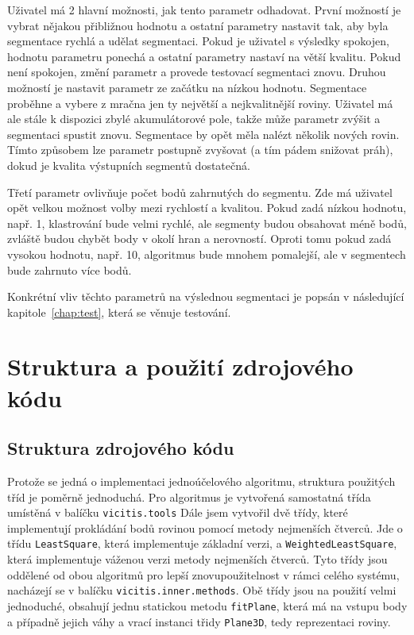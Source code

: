 \documentclass[11pt,twoside,a4paper]{book}
\begin{document}
Uživatel má 2 hlavní možnosti, jak tento parametr odhadovat. První možností je vybrat nějakou přibližnou hodnotu a ostatní parametry nastavit tak, aby byla segmentace rychlá a udělat  segmentaci. Pokud je uživatel s výsledky spokojen, hodnotu parametru ponechá a ostatní parametry nastaví na větší kvalitu. Pokud není spokojen, změní parametr a provede testovací segmentaci znovu. Druhou možností je nastavit parametr ze začátku na nízkou hodnotu. Segmentace proběhne a vybere z mračna jen ty největší a nejkvalitnější roviny. Uživatel má ale stále k dispozici zbylé akumulátorové pole, takže může parametr zvýšit a segmentaci spustit znovu. Segmentace by opět měla nalézt několik nových rovin. Tímto způsobem lze parametr postupně zvyšovat (a tím pádem snižovat práh), dokud je kvalita výstupních segmentů dostatečná.

Třetí parametr ovlivňuje počet bodů zahrnutých do segmentu. Zde má uživatel opět velkou možnost volby mezi rychlostí a kvalitou. Pokud zadá nízkou hodnotu, např. 1, klastrování bude velmi rychlé, ale segmenty budou obsahovat méně bodů, zvláště budou chybět body v okolí hran a nerovností. Oproti tomu pokud zadá vysokou hodnotu, např. 10, algoritmus bude mnohem pomalejší, ale v segmentech bude zahrnuto více bodů.

Konkrétní vliv těchto parametrů na výslednou segmentaci je popsán v následující kapitole~\ref{chap:test}, která se věnuje testování.

\section{Struktura a použití zdrojového kódu}


\subsection{Struktura zdrojového kódu}

Protože se jedná o implementaci jednoúčelového algoritmu, struktura použitých tříd je poměrně jednoduchá. Pro  algoritmus je vytvořená samostatná třída umístěná v balíčku \verb|vicitis.tools| Dále jsem vytvořil dvě třídy, které implementují prokládání bodů rovinou pomocí metody nejmenších čtverců. Jde o třídu \verb|LeastSquare|, která implementuje základní verzi, a \verb|WeightedLeastSquare|, která implementuje váženou verzi metody nejmenších čtverců. Tyto třídy jsou oddělené od obou algoritmů pro lepší znovupoužitelnost v rámci celého systému, nacházejí se v balíčku \verb|vicitis.inner.methods|. Obě třídy jsou na použití velmi jednoduché, obsahují jednu statickou metodu \verb|fitPlane|, která má na vstupu body a případně jejich váhy a vrací instanci třidy \verb|Plane3D|, tedy reprezentaci roviny.
\end{document}
